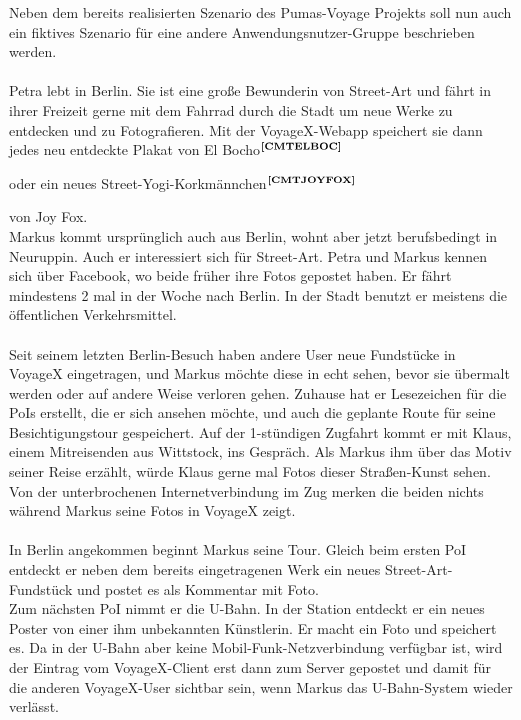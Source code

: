 \noindent
Neben dem bereits realisierten Szenario des Pumas-Voyage Projekts soll nun auch ein fiktives Szenario für eine andere Anwendungsnutzer-Gruppe beschrieben werden.\\ \\
Petra lebt in Berlin. Sie ist eine große Bewunderin von Street-Art und fährt in ihrer Freizeit gerne mit dem Fahrrad durch die Stadt um neue Werke zu entdecken und zu Fotografieren. Mit der VoyageX-Webapp speichert sie dann jedes neu entdeckte Plakat von El Bocho$^{\textbf{\ref{CMTELBOC}}}$%
\addtocounter{footnote}{1}%
 oder ein neues Street-Yogi-Korkmännchen$^{\textbf{\ref{CMTJOYFOX}}}$%
\addtocounter{footnote}{1}%
 von Joy Fox.
\\ %
Markus kommt ursprünglich auch aus Berlin, wohnt aber jetzt berufsbedingt in Neuruppin. Auch er interessiert sich für Street-Art. Petra und Markus kennen sich über Facebook, wo beide früher ihre Fotos gepostet haben. Er fährt mindestens 2 mal in der Woche nach Berlin. In der Stadt benutzt er meistens die öffentlichen Verkehrsmittel.\\ \\
Seit seinem letzten Berlin-Besuch haben andere User neue Fundstücke in VoyageX eingetragen, und Markus möchte diese in echt sehen, bevor sie übermalt werden oder auf andere Weise verloren gehen. Zuhause hat er Lesezeichen für die PoIs erstellt, die er sich ansehen möchte, und auch die geplante Route für seine Besichtigungstour gespeichert. Auf der 1-stündigen Zugfahrt kommt er mit Klaus, einem Mitreisenden aus Wittstock, ins Gespräch. Als Markus ihm über das Motiv seiner Reise erzählt, würde Klaus gerne mal Fotos dieser Straßen-Kunst sehen. Von der unterbrochenen Internetverbindung im Zug merken die beiden nichts während Markus seine Fotos in VoyageX zeigt.\\ \\
In Berlin angekommen beginnt Markus seine Tour. Gleich beim ersten PoI entdeckt er neben dem bereits eingetragenen Werk ein neues Street-Art-Fundstück und postet es als Kommentar mit Foto.\\
Zum nächsten PoI nimmt er die U-Bahn. In der Station entdeckt er ein neues Poster von einer ihm unbekannten Künstlerin. Er macht ein Foto und speichert es. Da in der U-Bahn aber keine Mobil-Funk-Netzverbindung verfügbar ist, wird der Eintrag vom VoyageX-Client erst dann zum Server gepostet und damit für die anderen VoyageX-User sichtbar sein, wenn Markus das U-Bahn-System wieder verlässt.\\
